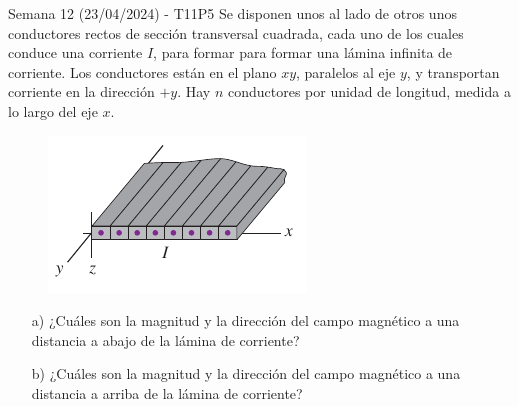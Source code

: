 \begin{frame}{Semana 12 (23/04/2024) - T11P5}
    Se disponen unos al lado de otros unos conductores rectos de sección transversal cuadrada, cada uno de los cuales conduce una corriente $I$, para formar para formar una lámina infinita de corriente. Los conductores están en el plano $xy$, paralelos al eje $y$, y transportan corriente en la dirección $+y$. Hay $n$ conductores por unidad de longitud, medida a lo largo del eje $x$.
    
    \begin{figure}
        \centering
        \includegraphics[scale=0.4]{figures/t11p5.png}
    \end{figure}
    
    \begin{itemize}
        \item[a)] ¿Cuáles son la magnitud y la dirección del campo magnético a una distancia a abajo de la lámina de corriente?
        \item[b)] ¿Cuáles son la magnitud y la dirección del campo magnético a una distancia a arriba de la lámina de corriente?
    \end{itemize}
\end{frame}

